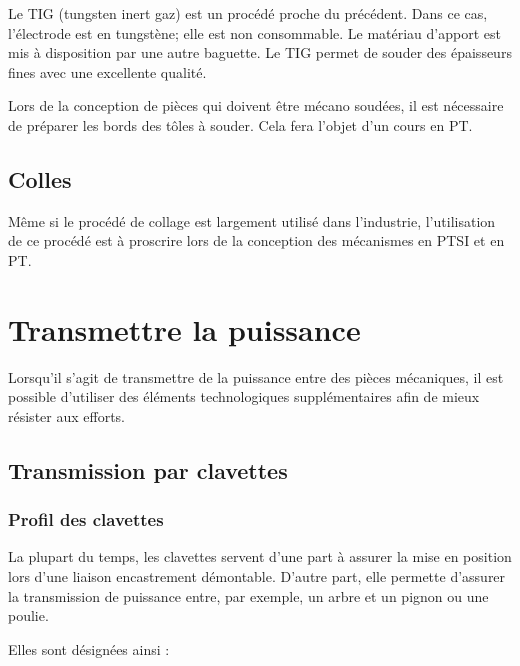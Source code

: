 \documentclass[11pt,oneside]{article}
\begin{document}
Le TIG (tungsten inert gaz) est un procédé proche du précédent. Dans ce cas, l'électrode est en tungstène; elle est non consommable. Le matériau d'apport est mis à disposition par une autre baguette. Le TIG permet de souder des épaisseurs fines avec une excellente qualité.

Lors de la conception de pièces qui doivent être mécano soudées, il est nécessaire de préparer les bords des tôles à souder. Cela fera l'objet d'un cours en PT. 


\subsection{Colles}
Même si le procédé de collage est largement utilisé dans l'industrie, l'utilisation de ce procédé est à proscrire lors de la conception des mécanismes en PTSI et en PT. 

\section{Transmettre la puissance}

Lorsqu'il s'agit de transmettre de la puissance entre des pièces mécaniques, il est possible d'utiliser des éléments technologiques supplémentaires afin de mieux résister aux efforts. 

\subsection{Transmission par clavettes}

\subsubsection{Profil des clavettes}
La plupart du temps, les clavettes servent d'une part à assurer la mise en position lors d'une liaison encastrement démontable. D'autre part, elle permette d'assurer la transmission de puissance entre, par exemple, un arbre et un pignon ou une poulie.

Elles sont désignées ainsi :
\end{document}
